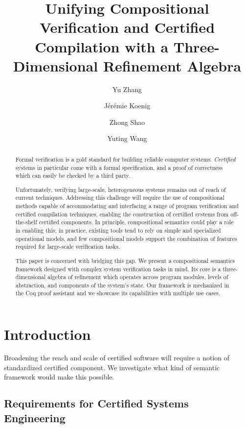 \documentclass[acmsmall,screen,review,anonymous]{acmart}
\title{Unifying Compositional Verification and Certified Compilation
  with a Three-Dimensional Refinement Algebra}
\author{Yu Zhang}
\affiliation{
  \institution{Yale University}
  \city{New Haven}
  \state{CT}
  \country{USA}}
\author{J\'er\'emie Koenig}
\affiliation{
  \institution{Yale University}
  \city{New Haven}
  \state{CT}
  \country{USA}}
\author{Zhong Shao}
\affiliation{
  \institution{Yale University}
  \city{New Haven}
  \state{CT}
  \country{USA}}
\author{Yuting Wang}
\affiliation{
  \institution{Shanghai Jiao Tong University}
  \city{Shanghai}
  \country{China}}
\begin{document}
\newtheorem{remark}[theorem]{Remark}

\begin{abstract} %
Formal verification is a gold standard
for building reliable computer systems.
\emph{Certified} systems in particular
come with a formal specification,
and a proof of correctness
which can easily be checked by a third party.

Unfortunately, verifying large-scale, heterogeneous systems
remains out of reach of current techniques.
Addressing this challenge
will require the use of compositional methods
capable of accommodating and interfacing
a range of program verification and certified compilation techniques,
enabling the construction of certified systems
from off-the-shelf certified components.
In principle,
compositional semantics
could play a role in enabling this;
in practice,
existing tools
tend to rely on
simple and specialized
operational models,
and few compositional models
support the combination of features
required for large-scale verification tasks.

This paper is concerned with bridging this gap.
We present a compositional semantics framework
designed with complex system verification tasks in mind.
Its core is a three-dimensional algebra of refinement
which operates across program modules,
levels of abstraction, and
components of the system's state.
Our framework is mechanized in the Coq proof assistant
and we showcase its capabilities with multiple use cases.
\end{abstract}


\maketitle

\section{Introduction} \label{sec:intro} %

Broadening the reach and scale
of certified software \cite{shao10}
will require a notion of standardized certified component.
We investigate what kind of
semantic framework would make this possible.


\subsection{Requirements for Certified Systems Engineering} \label{sec:req} %
\end{document}
